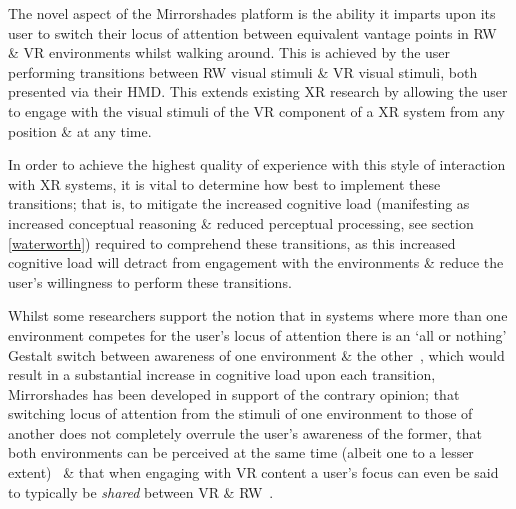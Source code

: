 \documentclass[conference]{acmsiggraph}
\begin{document}
\newcommand{\breakinpresencefootnote}{\footnote{The definition of \textbf{break in presence} adopted herein is the second from Waterworth \& Waterworth~\cite{Waterworth2001} (p205): a movement along the focus axis away from presence in the real or a virtual environment \& toward absence. This differs to Slater \& Steed's original definition in~\cite{Slater2000} as they considered presence only in terms of attending to stimuli from a virtual environment, with a break in presence as a Gestalt switch to instead attending to stimuli from the real environment. Waterworth \& Waterworth's model considers presence in terms of attending to stimuli from either the real \textit{or a virtual} environment, with a break in presence representing absence in the sense of heightened conceptual load \& the resultant reduced perceptual processing of environmental stimuli originating from \textit{either} the real or a virtual environment. This definition better fits the situation invoked by the Mirrorshades platform, which is concerned with intentionally \& willingly switching engagement between stimuli from both real \& virtual environments, rather than engaging with stimuli from only a virtual environment in a scenario where stimuli from the real environment are considered a `distraction'.}}

The novel aspect of the Mirrorshades platform is the ability it imparts upon its user to switch their locus of attention between equivalent vantage points in RW \& VR environments whilst walking around. This is achieved by the user performing transitions between RW visual stimuli \& VR visual stimuli, both presented via their HMD. This extends existing XR research by allowing the user to engage with the visual stimuli of the VR component of a XR system from any position \& at any time.

In order to achieve the highest quality of experience with this style of interaction with XR systems, it is vital to determine how best to implement these transitions; that is, to mitigate the increased cognitive load (manifesting as increased conceptual reasoning \& reduced perceptual processing, see section \ref{waterworth}) required to comprehend these transitions, as this increased cognitive load will detract from engagement with the environments \& reduce the user's willingness to perform these transitions.

Whilst some researchers support the notion that in systems where more than one environment competes for the user's locus of attention there is an `all or nothing' Gestalt switch between awareness of one environment \& the other~\cite{Slater2002}, which would result in a substantial increase in cognitive load upon each transition, Mirrorshades has been developed in support of the contrary opinion; that switching locus of attention from the stimuli of one environment to those of another does not completely overrule the user's awareness of the former, that both environments can be perceived at the same time (albeit one to a lesser extent)~\cite{Ijsselsteijn2001} \& that when engaging with VR content a user's focus can even be said to typically be \textit{shared} between VR \& RW~\cite{Waterworth2001}.
\end{document}
